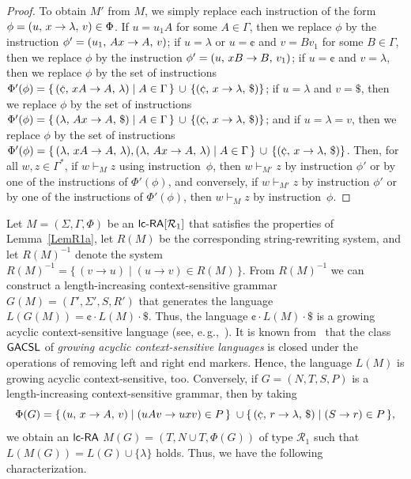 \begin{proof}
To obtain $M'$ from $M$, we simply replace each instruction of the form $\phi=(u,\,x\rightarrow\lambda,\,v)\in \Phi$. If $u=u_1A$ for some $A\in\Gamma$, then we replace $\phi$ by the instruction $\phi'=(u_1,\,Ax\rightarrow A,\,v)$; if $u=\lambda$ or $u=\cent$ and $v=Bv_1$ for some $B\in\Gamma$, then we replace $\phi$ by the instruction $\phi'=(u,\,xB\rightarrow B,\,v_1)$; if $u =\cent$ and $v=\lambda$, then we replace $\phi$ by the set of instructions $\Phi'(\phi) = \{\,\rarule{\cent}{xA}{A}{\lambda}\mid A\in \Gamma\,\} \,\cup\,\{\rarule{\cent}{x}{\lambda}{\$}\}$; if $u=\lambda$ and $v=\$$, then we replace $\phi$ by the set of instructions $\Phi'(\phi) = \{\,\rarule{\lambda}{Ax}{A}{\$}\mid A\in \Gamma\,\} \,\cup\,\{\rarule{\cent}{x}{\lambda}{\$}\}$; and if $u=\lambda=v$, then we replace $\phi$ by the set of instructions $\Phi'(\phi) = \{\,\rarule{\lambda}{xA}{A}{\lambda},\rarule{\lambda}{Ax}{A}{\lambda}\mid A\in \Gamma\,\} \,\cup\,\{\rarule{\cent}{x}{\lambda}{\$}\}$. Then, for all $w,z\in\Gamma^*$, if $w\vdash_M z$ using instruction~$\phi$, then $w\vdash_{M'} z$ by instruction $\phi'$ or by one of the instructions of $\Phi'(\phi)$, and conversely, if $w\vdash_{M'} z$ by instruction $\phi'$ or by one of the instructions of $\Phi'(\phi)$, then $w\vdash_M z$ by instruction~$\phi$.
\end{proof}

Let $M=(\Sigma,\Gamma,\Phi)$ be an $\lcRA[1]$ that satisfies the properties of Lemma~\ref{LemR1a}, let $R(M)$ be the corresponding string-rewriting system, and let $R(M)^{-1}$ denote the system $R(M)^{-1} = \{\,(v\to u) \mid (u\to v)\in R(M)\,\}.$ From $R(M)^{-1}$ we can construct a length-increasing context-sensitive grammar $G(M) = (\Gamma',\Sigma',S,R')$ that generates the language $L(G(M)) = \cent\cdot L(M)\cdot\$$. Thus, the language $\cent\cdot L(M)\cdot\$$ is a growing acyclic context-sensitive language  (see, e.\,g.,~\cite{NiWo01}). It is known from~\cite{BunHabil} that the class $\textup{\sf GACSL}$ of \emph{growing acyclic context-sensitive languages} is closed under the operations of removing left and right end markers. Hence, the language $L(M)$ is growing acyclic context-sensitive, too. Conversely, if $G=(N,T,S,P)$ is a length-increasing context-sensitive grammar, then by taking
$$
\Phi(G)  =  \{\,\rarule{u}{x}{A}{v} \mid (uAv\to uxv)\in P\,\}\; \cup
            \{\,\rarule{\cent}{r}{\lambda}{\$}\mid (S\to r)\in P\,\},
$$
we obtain an $\lcRA$ $M(G) = (T,N\cup T,\Phi(G))$ of type $\mathcal{R}_1$ such that $L(M(G)) = L(G)\cup\{\lambda\}$ holds. Thus,  we have the following characterization.

